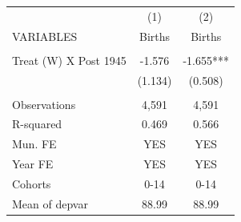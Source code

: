 \begin{tabular}{lcc} \hline
 & (1) & (2) \\
VARIABLES & Births & Births \\ \hline
 &  &  \\
Treat (W) X Post 1945 & -1.576 & -1.655*** \\
 & (1.134) & (0.508) \\
 &  &  \\
Observations & 4,591 & 4,591 \\
R-squared & 0.469 & 0.566 \\
Mun. FE & YES & YES \\
Year FE & YES & YES \\
Cohorts & 0-14 & 0-14 \\
 Mean of depvar & 88.99 & 88.99 \\ \hline
\end{tabular}
